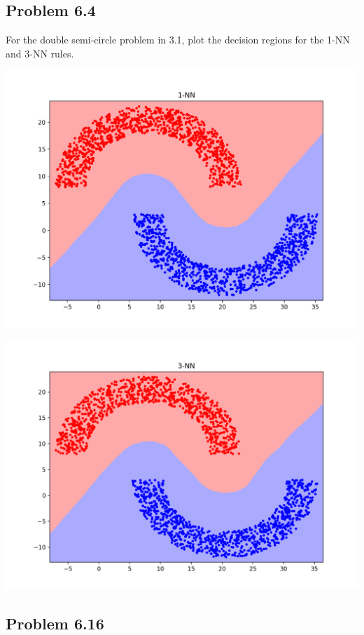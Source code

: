 \documentclass{article}
\begin{document}
\subsection*{Problem 6.4}

For the double semi-circle problem in 3.1, plot the decision regions for the 1-NN and 3-NN rules.


\begin{center}
\includegraphics[width=\textwidth]{64-1nn.png}
\end{center}
\begin{center}
\includegraphics[width=\textwidth]{64-3nn.png}
\end{center}

\subsection*{Problem 6.16}
\end{document}
